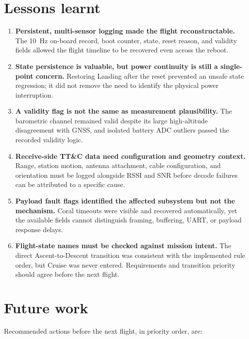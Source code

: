\documentclass[11pt,a4paper]{article}
\begin{document}
\section{Lessons learnt}

\begin{enumerate}
  \item \textbf{Persistent, multi-sensor logging made the flight reconstructable.}
  The 10~Hz on-board record, boot counter, state, reset reason, and validity
  fields allowed the flight timeline to be recovered even across the reboot.
  \item \textbf{State persistence is valuable, but power continuity is still a
  single-point concern.} Restoring Landing after the reset prevented an unsafe
  state regression; it did not remove the need to identify the physical power
  interruption.
  \item \textbf{A validity flag is not the same as measurement plausibility.}
  The barometric channel remained valid despite its large high-altitude
  disagreement with GNSS, and isolated battery ADC outliers passed the recorded
  validity logic.
  \item \textbf{Receive-side TT\&C data need configuration and geometry context.}
  Range, station motion, antenna attachment, cable configuration, and orientation
  must be logged alongside RSSI and SNR before decode failures can be attributed
  to a specific cause.
  \item \textbf{Payload fault flags identified the affected subsystem but not
  the mechanism.} Coral timeouts were visible and recovered automatically, yet
  the available fields cannot distinguish framing, buffering, UART, or payload
  response delays.
  \item \textbf{Flight-state names must be checked against mission intent.} The
  direct Ascent-to-Descent transition was consistent with the implemented rule
  order, but Cruise was never entered. Requirements and transition priority
  should agree before the next flight.
\end{enumerate}

\clearpage
\section{Future work}

Recommended actions before the next flight, in priority order, are:
\end{document}
